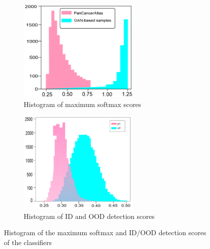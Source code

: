 \begin{figure}[h]
	\centering
	\begin{subfigure}{.48\linewidth}
		\centering
		\includegraphics[width=0.9\linewidth,height=50mm]{images/ood_detection.png}
		\caption{Histogram of maximum softmax scores}
        \label{fig:max_soft_score}
	\end{subfigure}
	\begin{subfigure}{0.48\linewidth}
		\centering
		\includegraphics[width=0.9\linewidth,height=50mm]{images/hist_max_softmax.png}
		\caption{Histogram of ID and OOD detection scores}
		\label{fig:id_ood_de_scores}
	\end{subfigure}
	\caption{Histogram of the maximum softmax and ID/OOD detection scores of the classifiers} 
	\label{fig:max_soft_scores_and_de_scores}
\end{figure}

